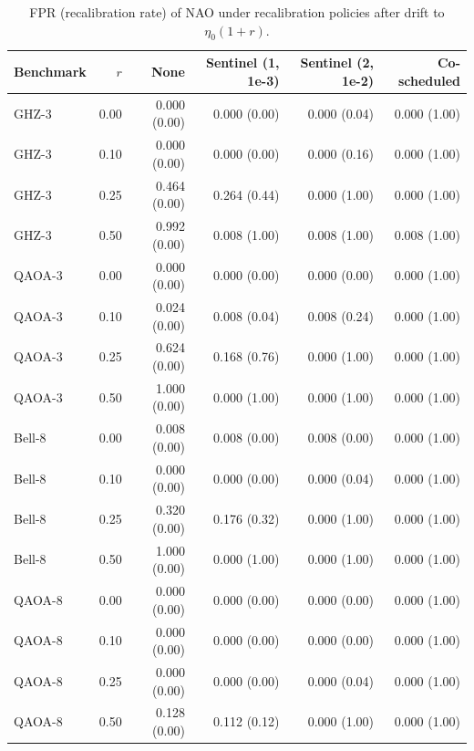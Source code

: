 \begin{table}[t]
\centering
\caption{FPR (recalibration rate) of NAO under recalibration policies after drift to $\eta_0(1+r)$.}
\label{tab:rq5-drift}
\small
\begin{tabular}{lrrrrr}
\toprule
Benchmark & $r$ & None & Sentinel (1, 1e-3) & Sentinel (2, 1e-2) & Co-scheduled \\
\midrule
GHZ-3 & 0.00 & 0.000 (0.00) & 0.000 (0.00) & 0.000 (0.04) & 0.000 (1.00) \\
GHZ-3 & 0.10 & 0.000 (0.00) & 0.000 (0.00) & 0.000 (0.16) & 0.000 (1.00) \\
GHZ-3 & 0.25 & 0.464 (0.00) & 0.264 (0.44) & 0.000 (1.00) & 0.000 (1.00) \\
GHZ-3 & 0.50 & 0.992 (0.00) & 0.008 (1.00) & 0.008 (1.00) & 0.008 (1.00) \\
QAOA-3 & 0.00 & 0.000 (0.00) & 0.000 (0.00) & 0.000 (0.00) & 0.000 (1.00) \\
QAOA-3 & 0.10 & 0.024 (0.00) & 0.008 (0.04) & 0.008 (0.24) & 0.000 (1.00) \\
QAOA-3 & 0.25 & 0.624 (0.00) & 0.168 (0.76) & 0.000 (1.00) & 0.000 (1.00) \\
QAOA-3 & 0.50 & 1.000 (0.00) & 0.000 (1.00) & 0.000 (1.00) & 0.000 (1.00) \\
Bell-8 & 0.00 & 0.008 (0.00) & 0.008 (0.00) & 0.008 (0.00) & 0.000 (1.00) \\
Bell-8 & 0.10 & 0.000 (0.00) & 0.000 (0.00) & 0.000 (0.04) & 0.000 (1.00) \\
Bell-8 & 0.25 & 0.320 (0.00) & 0.176 (0.32) & 0.000 (1.00) & 0.000 (1.00) \\
Bell-8 & 0.50 & 1.000 (0.00) & 0.000 (1.00) & 0.000 (1.00) & 0.000 (1.00) \\
QAOA-8 & 0.00 & 0.000 (0.00) & 0.000 (0.00) & 0.000 (0.00) & 0.000 (1.00) \\
QAOA-8 & 0.10 & 0.000 (0.00) & 0.000 (0.00) & 0.000 (0.00) & 0.000 (1.00) \\
QAOA-8 & 0.25 & 0.000 (0.00) & 0.000 (0.00) & 0.000 (0.04) & 0.000 (1.00) \\
QAOA-8 & 0.50 & 0.128 (0.00) & 0.112 (0.12) & 0.000 (1.00) & 0.000 (1.00) \\
\bottomrule
\end{tabular}
\end{table}

